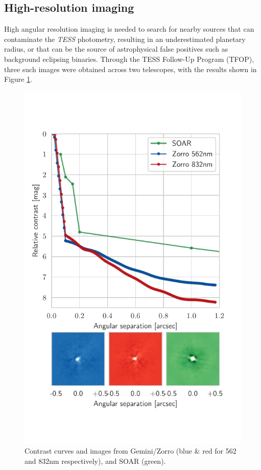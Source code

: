 \documentclass[fleqn,usenatbib]{mnras}
\newcommand{\tess}{{\it TESS}}
\begin{document}
\subsection{High-resolution imaging}
High angular resolution imaging is needed to search for nearby sources that can contaminate the \tess{} photometry, resulting in an underestimated planetary radius, or that can be the source of astrophysical false positives such as background eclipsing binaries. 
Through the TESS Follow-Up Program (TFOP), three such images were obtained across two telescopes, with the results shown in Figure \ref{fig:imaging}.
\begin{figure}
    \centering
    \includegraphics[width=\columnwidth, trim={0 2cm 0.6cm 1.2cm}]{Imaging}
    \caption{Contrast curves and images from Gemini/Zorro (blue \& red for 562 and 832nm respectively), and SOAR (green).}
    \label{fig:imaging}
\end{figure}
\end{document}
